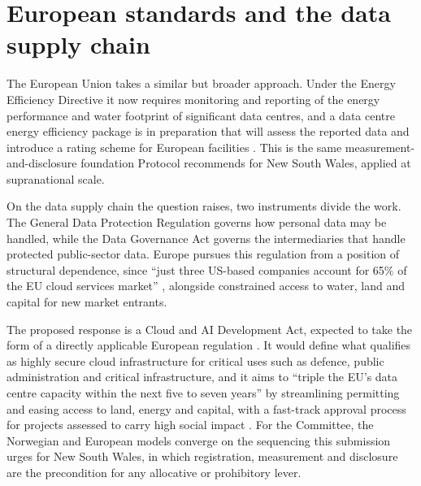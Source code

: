 \section{European standards and the data supply chain}
\label{sec:supp:qon:europe}

The European Union takes a similar but broader approach. Under the Energy Efficiency Directive it now requires monitoring and reporting of the energy performance and water footprint of significant data centres, and a data centre energy efficiency package is in preparation that will assess the reported data and introduce a rating scheme for European facilities \autocite{ecEnergyPerformanceDataCentres2024}. This is the same measurement-and-disclosure foundation Protocol recommends for New South Wales, applied at supranational scale.

On the data supply chain the question raises, two instruments divide the work. The General Data Protection Regulation governs how personal data may be handled, while the Data Governance Act governs the intermediaries that handle protected public-sector data. Europe pursues this regulation from a position of structural dependence, since \enquote{just three US-based companies account for 65\% of the EU cloud services market} \autocite{marcelinCloudAIDevelopment2025}, alongside constrained access to water, land and capital for new market entrants.

The proposed response is a Cloud and AI Development Act, expected to take the form of a directly applicable European regulation \autocite{aliEUCloudAIAct2025}. It would define what qualifies as highly secure cloud infrastructure for critical uses such as defence, public administration and critical infrastructure, and it aims to \enquote{triple the EU's data centre capacity within the next five to seven years} by streamlining permitting and easing access to land, energy and capital, with a fast-track approval process for projects assessed to carry high social impact \autocite{marcelinCloudAIDevelopment2025}. For the Committee, the Norwegian and European models converge on the sequencing this submission urges for New South Wales, in which registration, measurement and disclosure are the precondition for any allocative or prohibitory lever.
